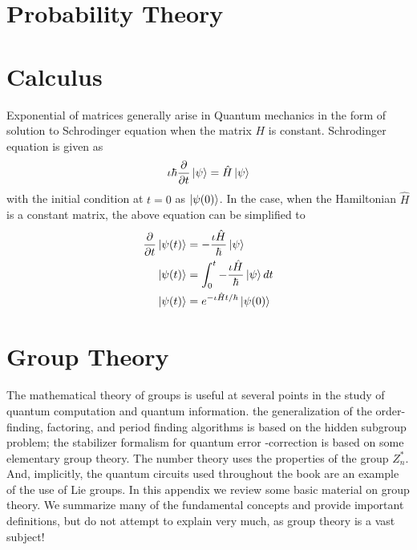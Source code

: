 \newpage

\section{Probability Theory}





\section{Calculus}
Exponential of matrices generally arise in Quantum mechanics in the form of solution to Schrodinger equation when the matrix $H$ is constant. Schrodinger equation is given as
\[
\iota \hbar\frac{\partial}{\partial t}\ket{\psi}=\hat{H}\ket{\psi}
\]
with the initial condition at $t=0$ as $\ket{\psi(0)}$.
In the case, when the Hamiltonian $\hat{H}$ is a constant matrix, the above equation can be simplified to
\begin{align*}
\frac{\partial}{\partial t}\ket{\psi(t)}&=- \frac{\iota\hat{H}}{\hbar}\ket{\psi}\\
\ket{\psi(t)}&=\int_0^t - \frac{\iota\hat{H}}{\hbar}\ket{\psi} dt\\
\ket{\psi(t)}&=e^{-\iota \hat{H}t/\hbar }\ket{\psi(0)}
\end{align*}








\section{Group Theory}
The mathematical theory of groups is useful at several points in the study of quantum computation and quantum information. the generalization of the order-finding, factoring, and period finding algorithms is based on the hidden subgroup problem; the stabilizer formalism for quantum error -correction is based on some elementary group theory. The number theory uses the properties of the group $Z_n^*$. And, implicitly, the quantum circuits used throughout the book are an example of the use of Lie groups. In this appendix we review some basic material on group theory. We summarize many of the fundamental concepts and provide important definitions, but do not attempt to explain very much, as group theory is a vast subject!


